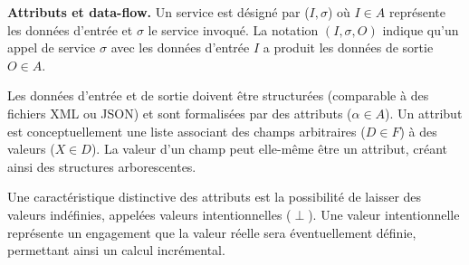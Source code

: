 \textbf{Attributs et data-flow.}
Un service est désigné par ($I,\sigma$) où $I \in A$ représente les données d'entrée et $\sigma$ le service invoqué. La notation $(I,\sigma, O)$ indique qu'un appel de service $\sigma$ avec les données d'entrée $I$ a produit les données de sortie $O \in A$.

Les données d'entrée et de sortie doivent être structurées (comparable à des fichiers XML ou JSON) et sont formalisées par des attributs ($\alpha \in A$). Un attribut est conceptuellement une liste associant des champs arbitraires ($D \in F$) à des valeurs ($X \in D$). La valeur d'un champ peut elle-même être un attribut, créant ainsi des structures arborescentes.

Une caractéristique distinctive des attributs est la possibilité de laisser des valeurs indéfinies, appelées valeurs intentionnelles ($\perp$). Une valeur intentionnelle représente un engagement que la valeur réelle sera éventuellement définie, permettant ainsi un calcul incrémental.

